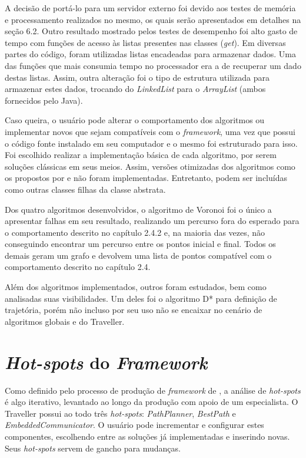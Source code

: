 A decisão de portá-lo para um servidor externo foi devido aos testes de memória e processamento realizados no mesmo, os quais serão apresentados em detalhes na seção 6.2. Outro resultado mostrado pelos testes de desempenho foi alto gasto de tempo com funções de acesso às listas presentes nas classes (\textit{get}). Em diversas partes do código, foram utilizadas listas encadeadas para armazenar dados. Uma das funções que mais consumia tempo no processador era a de recuperar um dado destas listas. Assim, outra alteração foi o tipo de estrutura utilizada para armazenar estes dados, trocando do \textit{LinkedList} para o \textit{ArrayList} (ambos fornecidos pelo Java).

Caso queira, o usuário pode alterar o comportamento dos algoritmos ou implementar novos que sejam compatíveis com o \textit{framework}, uma vez que possui o código fonte instalado em seu computador e o mesmo foi estruturado para isso. Foi escolhido realizar a implementação básica de cada algoritmo, por serem soluções clássicas em seus meios. Assim, versões otimizadas dos algoritmos como os propostos por \cite{Souza2008} e \cite{Medeiros2011} não foram implementadas. Entretanto, podem ser incluídas como outras classes filhas da classe abstrata.

Dos quatro algoritmos desenvolvidos, o algoritmo de Voronoi foi o único a apresentar falhas em seu resultado, realizando um percurso fora do esperado para o comportamento descrito no capítulo 2.4.2 e, na maioria das vezes, não conseguindo encontrar um percurso entre os pontos inicial e final. Todos os demais geram um grafo e devolvem uma lista de pontos compatível com o comportamento descrito no capítulo 2.4.

Além dos algoritmos implementados, outros foram estudados, bem como analisadas suas visibilidades. Um deles foi o algoritmo D* \cite{Ferguson__2005_5119} para definição de trajetória, porém não incluso por seu uso não se encaixar no cenário de algoritmos globais e do Traveller.

\section{\textit{Hot-spots} do \textit{Framework}}

Como definido pelo processo de produção de \textit{framework} de \cite{Fayad1999}, a análise de \textit{hot-spots} é algo iterativo, levantado ao longo da produção com apoio de um especialista. O Traveller possui ao todo três \textit{hot-spots}: \textit{PathPlanner}, \textit{BestPath} e \textit{EmbeddedCommunicator}. O usuário pode incrementar e configurar estes componentes, escolhendo entre as soluções já implementadas e inserindo novas. Seus \textit{hot-spots} servem de gancho para mudanças.

